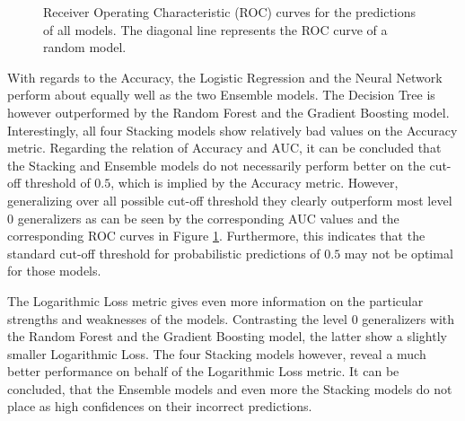 \documentclass[12pt]{article}
\begin{document}
\begin{figure}[!htp] 
\caption[ROC curves]{Receiver Operating Characteristic (ROC) curves for the predictions of all models. The diagonal line represents the ROC curve of a random model.}\label{aucplot}
\end{figure} 


With regards to the Accuracy, the Logistic Regression and the Neural Network perform about equally well as the two Ensemble models. The Decision Tree is however outperformed by the Random Forest and the Gradient Boosting model. Interestingly, all four Stacking models show relatively bad values on the Accuracy metric. Regarding the relation of Accuracy and AUC, it can be concluded that the Stacking and Ensemble models do not necessarily perform better on the cut-off threshold of $0.5$, which is implied by the Accuracy metric. However, generalizing over all possible cut-off threshold they clearly outperform most level 0 generalizers as can be seen by the corresponding AUC values and the corresponding ROC curves in Figure \ref{aucplot}. Furthermore, this indicates that the standard cut-off threshold for probabilistic predictions of $0.5$ may not be optimal for those models.

The Logarithmic Loss metric gives even more information on the particular strengths and weaknesses of the models. Contrasting the level 0 generalizers with the Random Forest and the Gradient Boosting model, the latter show a slightly smaller Logarithmic Loss. The four Stacking models however, reveal a much better performance on behalf of the Logarithmic Loss metric. It can be concluded, that the Ensemble models and even more the Stacking models do not place as high confidences on their incorrect predictions. 
\end{document}
